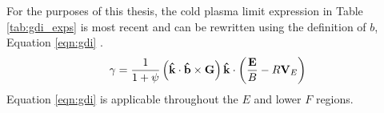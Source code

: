 For the purposes of this thesis, the cold plasma limit expression in Table \ref{tab:gdi_exps} is most recent and can be rewritten using the definition of \(b\), Equation \ref{eqn:gdi} \citep{Makarevich2014c,Makarevich2016a}.
\begin{equation}
	\label{eqn:gdi}
	\gamma = \frac{1}{1+\psi}\left(\mathbf{\hat{k}}\cdot\mathbf{\hat{b}}\times\mathbf{G}\right)\mathbf{\hat{k}}\cdot\left(\frac{\mathbf{E}}{B}-R\mathbf{V}_E\right)
\end{equation}
Equation \ref{eqn:gdi} is applicable throughout the \(E\) and lower \(F\) regions.  


